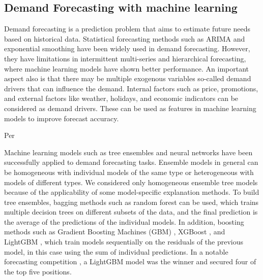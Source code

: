 





\subsection{Demand Forecasting with machine learning} \label{subsec:demand-forecasting-with-machine-learning}
Demand forecasting is a prediction problem that aims to estimate future needs based on historical data.
Statistical forecasting methods such as ARIMA\cite{jamal_fattah_forecasting_2018,ingle2021demand} and exponential smoothing \cite{ingle2021demand} have been widely used in demand forecasting.
However, they have limitations in intermittent multi-series and hierarchical forecasting, where machine learning models have shown better performance\cite{spiliotis2022comparison}.
An important aspect also is that there may be multiple exogenous variables so-called demand drivers\cite{vandeput2023demand} that can influence the demand.
Internal factors such as price, promotions, and external factors like weather, holidays, and economic indicators can be considered as demand drivers.
These can be used as features in machine learning models to improve forecast accuracy.

Per


Machine learning models such as tree ensembles and neural networks have been successfully applied to demand forecasting tasks\cite{spiliotis2022comparison}.
Ensemble models in general can be homogeneous with individual models of the same type or heterogeneous with models of different types.
We considered only homogeneous ensemble tree models because of the applicability of some model-specific explanation methods.
To build tree ensembles, bagging methods such as random forest\cite{leo_breiman_random_2001} can be used, which trains multiple decision trees on different subsets of the data, and the final prediction is the average of the predictions of the individual models.
In addition, boosting methods such as Gradient Boosting Machines (GBM) \cite{jerome_h_friedman_greedy_2001}, XGBoost \cite{tianqi_chen_xgboost_2016}, and LightGBM \cite{guolin_ke_highly_2017}, which train models sequentially on the residuals of the previous model, in this case using the sum of individual predictions.
In a notable forecasting competition \cite{makridakis_m5_2022}, a LightGBM model was the winner and secured four of the top five positions.


